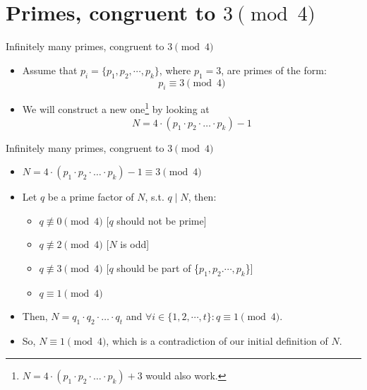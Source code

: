 \documentclass{beamer}
\begin{document}
\section{Primes, congruent to $3 \pmod{4}$}

\begin{frame}{Infinitely many primes, congruent to $3 \pmod{4}$}
    \begin{itemize}
        \item Assume that $p_i = \{p_1, p_2, \cdots, p_k\}$, where $p_1 = 3$, are primes of the form: $$p_i \equiv 3 \pmod 4$$        \item We will construct a new one\footnote{ $N = 4 \cdot (p_1 \cdot p_2 \cdot \ldots \cdot p_k) + 3$ would also work.}           by looking at 
            $$N = 4 \cdot (p_1 \cdot p_2 \cdot \ldots \cdot p_k) - 1 $$
    \end{itemize}
\end{frame}

\begin{frame}{Infinitely many primes, congruent to $3 \pmod{4}$}
    \begin{itemize}
        \item $N = 4 \cdot (p_1 \cdot p_2 \cdot \ldots \cdot p_k) - 1 \equiv 3 \pmod{4}$
        \item Let $q$ be a prime factor of $N$, s.t. $q \mid N$, then:
        \begin{itemize}
            \item $q \not\equiv 0 \pmod 4$ \hspace{0.5cm} {\scriptsize [$q$ should not be prime]}
            \item $q \not\equiv 2 \pmod 4$ \hspace{0.5cm} {\scriptsize [$N$ is odd]}
            \item $q \not\equiv 3 \pmod 4$ \hspace{0.5cm} {\scriptsize [$q$ should be part of \{$p_1, p_2. \cdots, p_k$\}]}
            \item $q \equiv 1 \pmod 4$
        \end{itemize}
        \item Then, $N = q_1 \cdot q_2 \cdot \ldots \cdot q_t$ and $\forall i \in \{1,2,\cdots,t\}: q \equiv 1 \pmod{4}$.
        \item So, $N \equiv 1 \pmod{4}$, which is a contradiction of our initial definition of $N$.
    \end{itemize}
\end{frame}
\end{document}
